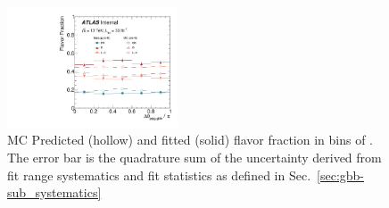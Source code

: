 \begin{figure}[htbp]
  \centering
 \includegraphics[width=0.45\textwidth]{figures/gbb/paperplots/Canv_dphi_FracDataMC}
\caption{MC Predicted (hollow) and fitted (solid) flavor fraction in bins of \dphi. The error bar is the quadrature sum of the uncertainty derived from fit range systematics and fit statistics as defined in Sec.~\ref{sec:gbb-sub_systematics}}
  \label{fig:dphi-fitfrac}
\end{figure}


